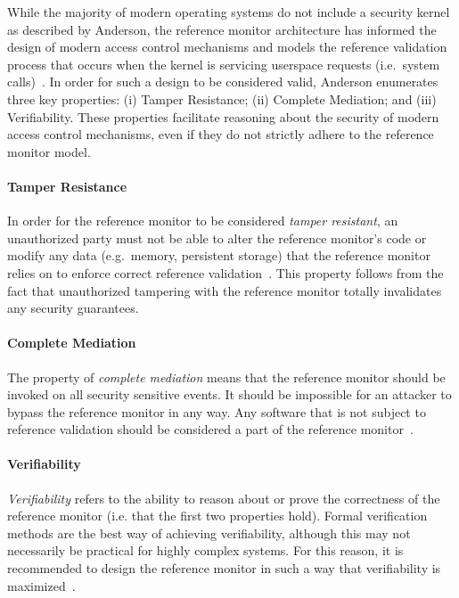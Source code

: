 \documentclass[
  fontsize=12pt,
  titlepage=firstiscover,
  paper=letter,
oneside,
  cleardoublepage=plain,
  parskip=half-,
  DIV=10,
  parindent,
  appendixprefix,
  chapterprefix,
  listof=totoc,
]{scrbook}
\begin{document}
While the majority of modern operating systems do not include a security kernel as
described by Anderson, the reference monitor architecture has informed the design of
modern access control mechanisms and models the reference validation process that occurs
when the kernel is servicing userspace requests (i.e.\ system
calls)~\cite{van_oorschot2020_tools_jewels}. In order for such a design to be considered
valid, Anderson enumerates three key properties: (i) Tamper Resistance; (ii) Complete
Mediation; and (iii) Verifiability. These properties facilitate reasoning about the
security of modern access control mechanisms, even if they do not strictly adhere to the
reference monitor model.

\paragraph*{Tamper Resistance}

In order for the reference monitor to be considered \textit{tamper resistant}, an unauthorized
party must not be able to alter the reference monitor's code or modify any data
(e.g.\ memory, persistent storage) that the reference monitor relies on to enforce correct
reference validation~\cite{anderson1972_report}. This property follows from the fact that
unauthorized tampering with the reference monitor totally invalidates any security
guarantees.

\paragraph*{Complete Mediation}

The property of \textit{complete mediation} means that the reference monitor should be
invoked on all security sensitive events. It should be impossible for an attacker to
bypass the reference monitor in any way. Any software that is not subject to reference
validation should be considered a part of the reference
monitor~\cite{anderson1972_report}.

\paragraph*{Verifiability}

\textit{Verifiability} refers to the ability to reason about or prove the correctness of
the reference monitor (i.e. that the first two properties hold). Formal verification methods
are the best way of achieving verifiability, although this may not necessarily be practical
for highly complex systems. For this reason, it is recommended to design the reference monitor
in such a way that verifiability is maximized~\cite{anderson1972_report}.
\end{document}

